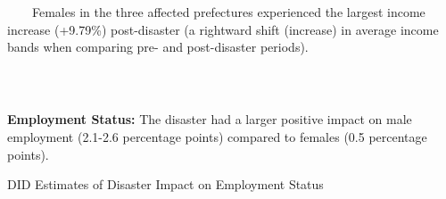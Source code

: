 \documentclass[serif, aspectratio=169]{beamer}
\newcommand{\incomebandlinks}{%
    \vfill %
    \hfill %
    {\small %
        \hyperlink{income_band}{\beamerbutton{Reference}} \,

    }
}
\begin{document}
\begin{frame}[label=income_band_main]
    \begin{column}{0.49\textwidth}
            \raggedright
    
    \vspace{-2.5cm}
    \hspace{-1.1cm}
\large {\qquad \ \ \ \ Females in the three affected prefectures experienced the largest income increase (+9.79\%) post-disaster (a rightward shift (increase) in average income bands when comparing pre- and post-disaster periods).}
    \end{column}
\vspace{-0.7cm}
\incomebandlinks
\end{frame}

\begin{frame}[label=employed]






\textbf{Employment Status:} The disaster had a larger positive impact on male employment (2.1-2.6 percentage points) compared to females (0.5 percentage points).

\begin{table}[htbp]
\centering
\caption{DID Estimates of Disaster Impact on Employment Status}

\vspace{-0.2cm}



\end{table}
\end{frame}
\end{document}
